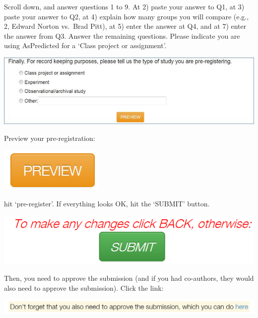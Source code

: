 \documentclass[
  oneside]{book}
\begin{document}
Scroll down, and answer questions 1 to 9. At 2) paste your answer to Q1, at 3)
paste your answer to Q2, at 4) explain how many groups you will compare (e.g.,
2, Edward Norton vs.~Brad Pitt), at 5) enter the answer at Q4, and at 7) enter
the answer from Q3. Answer the remaining questions. Please indicate you are
using AsPredicted for a `Class project or assignment'.

\begin{center}\includegraphics[width=1\linewidth]{images/aedb89e7e45561843864302129f6cbd6} \end{center}

Preview your pre-registration:

\begin{center}\includegraphics[width=0.2\linewidth]{images/4fbbec922f482e27aef0dd7f0714afad} \end{center}

hit `pre-register'. If everything looks OK, hit the `SUBMIT' button.

\begin{center}\includegraphics[width=1\linewidth]{images/7aa826d5b815c5aa18b66cfb6bcd30fe} \end{center}

Then, you need to approve the submission (and if you had co-authors, they would
also need to approve the submission). Click the link:

\begin{center}\includegraphics[width=1\linewidth]{images/c7691954684e51c29afa2aead98414c5} \end{center}
\end{document}
